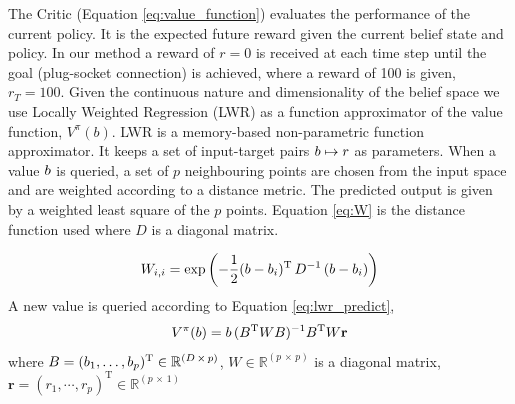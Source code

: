 

% 
%


The Critic (Equation \ref{eq:value_function}) evaluates 
the performance of the current policy. It is the expected future reward given the current 
belief state and policy.
In our method a reward of $r=0$ is received at each time step
until the goal (plug-socket connection) is achieved, where a reward of 100 is given, $r_{T}=100$.
Given the continuous nature and dimensionality of the belief space we use Locally Weighted Regression (LWR) \citep{Atkeson97locallyweighted}
as a function approximator of the value function, $V^{\pi}(b)$. LWR is a memory-based non-parametric function 
approximator. It keeps a set of input-target pairs $b \mapsto r$ as parameters. When a value $b$ is 
queried, a set of $p$ neighbouring points are chosen from the input space and are 
weighted according to a distance metric. The predicted output is given by a weighted 
least square of the $p$ points. Equation \ref{eq:W} is the distance function used where 
$D$ is a diagonal matrix.

\begin{equation}\label{eq:W}
 W_{i,i}  = \exp\left(-\frac{1}{2}(b - b_i)^{\mathrm{T}}\, D^{-1} \, (b - b_i) \right)
\end{equation}
A new value is queried according to Equation \ref{eq:lwr_predict},
\begin{equation}\label{eq:lwr_predict}
  V^{\pi}(b) = b \,(B^{\mathrm{T}} W B)^{-1} B^{\mathrm{T}} W \mathbf{r}
\end{equation}
where $B = (b_1,\dots,b_p)^{\mathrm{T}} \in \mathbb{R}^{(D\, \times\, p)}$, $W \in \mathbb{R}^{(p\, \times\, p)}$ is
a diagonal matrix, $\mathbf{r} = (r_1,\cdots,r_p)^{\mathrm{T}} \in \mathbb{R}^{(p\, \times\, 1)}$


